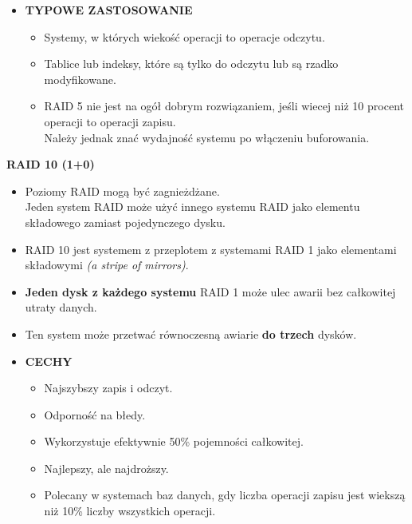 \documentclass[a5paper,6pt]{article}
\begin{document}
\begin{itemize}
        \item \textbf{TYPOWE ZASTOSOWANIE}
        \begin{itemize}
            \item Systemy, w których wiekość operacji to operacje odczytu.
            \item Tablice lub indeksy, które są tylko do odczytu lub są rzadko
                  modyfikowane.
            \item RAID 5 nie jest na ogół dobrym rozwiązaniem, jeśli wiecej niż
                  10 procent operacji to operacji zapisu.\\
                  Należy jednak znać wydajność systemu po włączeniu buforowania.
        \end{itemize}
    \end{itemize}

    \textbf{RAID 10 (1+0)}
    \begin{itemize}
        \item Poziomy RAID mogą być zagnieżdżane.\\
              Jeden system RAID może użyć innego systemu RAID jako elementu
              składowego zamiast pojedynczego dysku.
        \item RAID 10 jest systemem z przeplotem z systemami RAID 1 jako
              elementami składowymi \textit{(a stripe of mirrors)}.
        \item \textbf{Jeden dysk z każdego systemu} RAID 1 może ulec awarii
              bez całkowitej utraty danych.
    \end{itemize}

    \begin{center}
    \end{center}

    \begin{itemize}
        \item Ten system może przetwać równoczesną awiarie \textbf{do trzech}
              dysków.\\

        \item \textbf{CECHY}
        \begin{itemize}
            \item Najszybszy zapis i odczyt.
            \item Odporność na błedy.
            \item Wykorzystuje efektywnie 50\% pojemności całkowitej.
            \item Najlepszy, ale najdroższy.
            \item Polecany w systemach baz danych, gdy liczba operacji zapisu
                  jest wiekszą niż 10\% liczby wszystkich operacji.
        \end{itemize}
    \end{itemize}
\end{document}
